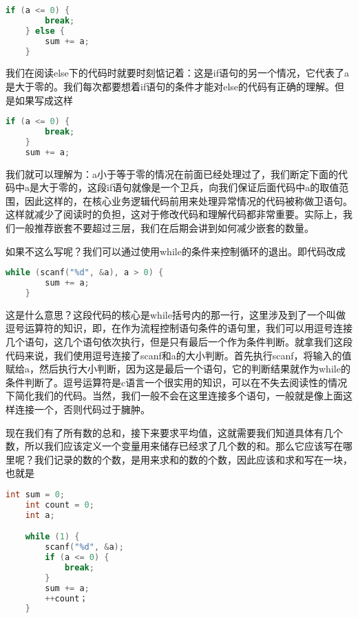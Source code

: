 \begin{lstlisting}[language=C]
    if (a <= 0) {
        break;
    } else {
        sum += a;
    }
\end{lstlisting}

我们在阅读else下的代码时就要时刻惦记着：这是if语句的另一个情况，它代表了a是大于零的。我们每次都要想着if语句的条件才能对else的代码有正确的理解。但是如果写成这样

\begin{lstlisting}[language=C]
    if (a <= 0) {
        break;
    }
    sum += a;
\end{lstlisting}

我们就可以理解为：a小于等于零的情况在前面已经处理过了，我们断定下面的代码中a是大于零的，这段if语句就像是一个卫兵，向我们保证后面代码中a的取值范围，因此这样的，在核心业务逻辑代码前用来处理异常情况的代码被称做卫语句。这样就减少了阅读时的负担，这对于修改代码和理解代码都非常重要。实际上，我们一般推荐嵌套不要超过三层，我们在后期会讲到如何减少嵌套的数量。

如果不这么写呢？我们可以通过使用while的条件来控制循环的退出。即代码改成

\begin{lstlisting}[language=C]
    while (scanf("%d", &a), a > 0) {
        sum += a;
    }
\end{lstlisting}

这是什么意思？这段代码的核心是while括号内的那一行，这里涉及到了一个叫做逗号运算符的知识，即，在作为流程控制语句条件的语句里，我们可以用逗号连接几个语句，这几个语句依次执行，但是只有最后一个作为条件判断。就拿我们这段代码来说，我们使用逗号连接了scanf和a的大小判断。首先执行scanf，将输入的值赋给a，然后执行大小判断，因为这是最后一个语句，它的判断结果就作为while的条件判断了。逗号运算符是c语言一个很实用的知识，可以在不失去阅读性的情况下简化我们的代码。当然，我们一般不会在这里连接多个语句，一般就是像上面这样连接一个，否则代码过于臃肿。

现在我们有了所有数的总和，接下来要求平均值，这就需要我们知道具体有几个数，所以我们应该定义一个变量用来储存已经求了几个数的和。那么它应该写在哪里呢？我们记录的数的个数，是用来求和的数的个数，因此应该和求和写在一块，也就是

\begin{lstlisting}[language=C]
    int sum = 0;
    int count = 0;
    int a;

    while (1) {
        scanf("%d", &a);
        if (a <= 0) {
            break;
        }
        sum += a;
        ++count；
    }
\end{lstlisting}

